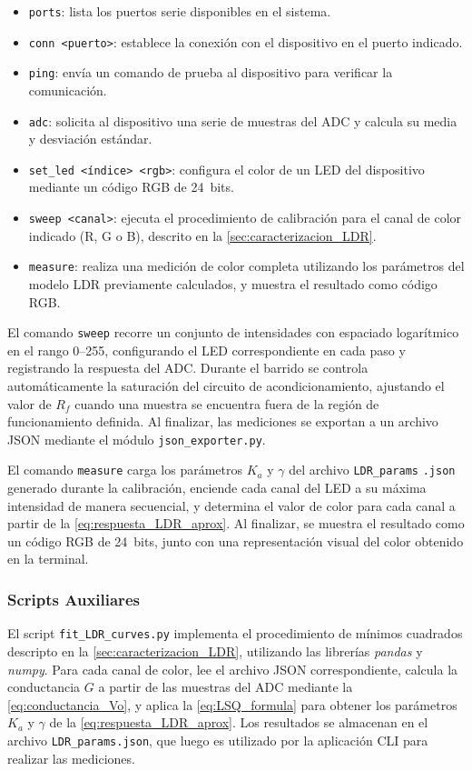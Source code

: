 \documentclass[12pt,a4paper,fleqn]{article}
\begin{document}
\begin{itemize}
    \item \verb|ports|: lista los puertos serie disponibles en el sistema.
    \item \verb|conn <puerto>|: establece la conexión con el dispositivo en el puerto indicado.
    \item \verb|ping|: envía un comando de prueba al dispositivo para verificar la comunicación.
    \item \verb|adc|: solicita al dispositivo una serie de muestras del ADC y calcula su media y
          desviación estándar.
    \item \verb|set_led <índice> <rgb>|: configura el color de un LED del dispositivo mediante un
          código RGB de \qty{24}{bits}.
    \item \verb|sweep <canal>|: ejecuta el procedimiento de calibración para el canal de color indicado (R, G o B), descrito en la \cref{sec:caracterizacion_LDR}.
    \item \verb|measure|: realiza una medición de color completa utilizando los parámetros del
          modelo LDR previamente calculados, y muestra el resultado como código RGB.
\end{itemize}

El comando \verb|sweep| recorre un conjunto de intensidades con espaciado logarítmico en el rango
\numrange{0}{255}, configurando el LED correspondiente en cada paso y registrando la respuesta del
ADC. Durante el barrido se controla automáticamente la saturación del circuito de acondicionamiento,
ajustando el valor de $R_f$ cuando una muestra se encuentra fuera de la región de funcionamiento
definida. Al finalizar, las mediciones se exportan a un archivo JSON mediante el módulo
\verb|json_exporter.py|.

El comando \verb|measure| carga los parámetros $K_a$ y $\gamma$ del archivo \verb|LDR_params|
\verb|.json| generado durante la calibración, enciende cada canal del LED a su máxima intensidad de manera secuencial, y determina el valor de color para cada canal a partir de la \cref{eq:respuesta_LDR_aprox}. Al finalizar, se muestra el resultado como un código RGB de \qty{24}{bits}, junto con una representación visual del color obtenido en la terminal.


\subsubsection{Scripts Auxiliares}

El script \verb|fit_LDR_curves.py| implementa el procedimiento de mínimos cuadrados descripto en
la \cref{sec:caracterizacion_LDR}, utilizando las librerías \textit{pandas} y \textit{numpy}.
Para cada canal de color, lee el archivo JSON correspondiente, calcula la conductancia $G$ a partir
de las muestras del ADC mediante la \cref{eq:conductancia_Vo}, y aplica la \cref{eq:LSQ_formula}
para obtener los parámetros $K_a$ y $\gamma$ de la \cref{eq:respuesta_LDR_aprox}. Los resultados
se almacenan en el archivo \verb|LDR_params.json|, que luego es utilizado por la aplicación CLI
para realizar las mediciones.
\end{document}
